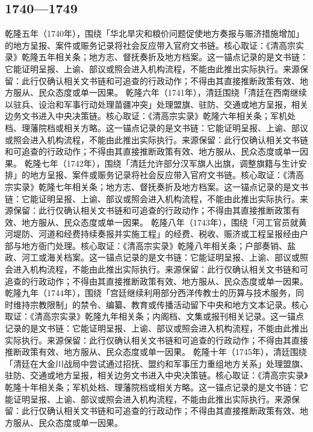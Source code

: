 \subsection{1740—1749}
乾隆五年（1740年），围绕「华北旱灾和粮价问题促使地方奏报与赈济措施增加」的地方呈报、案件或赈务记录将社会反应带入官府文书链。核心取证：《清高宗实录》乾隆五年相关条；地方志、督抚奏折及地方档案。这一锚点记录的是文书链：它能证明呈报、上谕、部议或照会进入机构流程，不能由此推出实际执行。来源保留：此行仅确认相关文书链和可追查的行政动作；不得由其直接推断政策有效、地方服从、民众态度或单一因果。
乾隆六年（1741年），清廷围绕「清廷在西南继续以驻兵、设治和军事行动处理苗疆冲突」处理盟旗、驻防、交通或地方呈报，相关边务文书进入中央决策链。核心取证：《清高宗实录》乾隆六年相关条；军机处档、理藩院档或相关方略。这一锚点记录的是文书链：它能证明呈报、上谕、部议或照会进入机构流程，不能由此推出实际执行。来源保留：此行仅确认相关文书链和可追查的行政动作；不得由其直接推断政策有效、地方服从、民众态度或单一因果。
乾隆七年（1742年），围绕「清廷允许部分汉军旗人出旗，调整旗籍与生计安排」的地方呈报、案件或赈务记录将社会反应带入官府文书链。核心取证：《清高宗实录》乾隆七年相关条；地方志、督抚奏折及地方档案。这一锚点记录的是文书链：它能证明呈报、上谕、部议或照会进入机构流程，不能由此推出实际执行。来源保留：此行仅确认相关文书链和可追查的行政动作；不得由其直接推断政策有效、地方服从、民众态度或单一因果。
乾隆八年（1743年），围绕「河工官员就黄河堤防、河道和经费持续奏报并实施工程」的经费、税收、赈济或工程呈报经由户部与地方衙门处理。核心取证：《清高宗实录》乾隆八年相关条；户部奏销、盐政、河工或海关档案。这一锚点记录的是文书链：它能证明呈报、上谕、部议或照会进入机构流程，不能由此推出实际执行。来源保留：此行仅确认相关文书链和可追查的行政动作；不得由其直接推断政策有效、地方服从、民众态度或单一因果。
乾隆九年（1744年），围绕「宫廷继续利用部分西洋传教士的历算与技术服务，同时维持宗教限制」的禁令、编纂、教育或传播活动留下中央和地方文本记录。核心取证：《清高宗实录》乾隆九年相关条；内阁档、文集或报刊相关记录。这一锚点记录的是文书链：它能证明呈报、上谕、部议或照会进入机构流程，不能由此推出实际执行。来源保留：此行仅确认相关文书链和可追查的行政动作；不得由其直接推断政策有效、地方服从、民众态度或单一因果。
乾隆十年（1745年），清廷围绕「清廷在大金川战局中尝试通过招抚、盟约和军事压力重组地方关系」处理盟旗、驻防、交通或地方呈报，相关边务文书进入中央决策链。核心取证：《清高宗实录》乾隆十年相关条；军机处档、理藩院档或相关方略。这一锚点记录的是文书链：它能证明呈报、上谕、部议或照会进入机构流程，不能由此推出实际执行。来源保留：此行仅确认相关文书链和可追查的行政动作；不得由其直接推断政策有效、地方服从、民众态度或单一因果。
